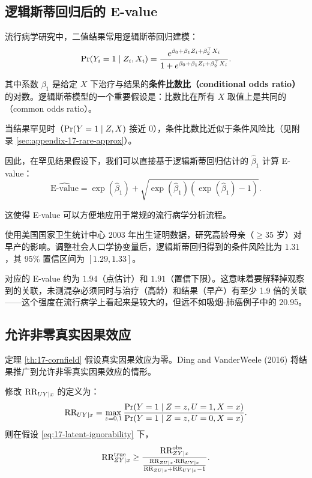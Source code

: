 \subsection{逻辑斯蒂回归后的 E-value}\label{sec:17-evalue-logistic}

流行病学研究中，二值结果常用逻辑斯蒂回归建模：
\begin{equation}
\operatorname{Pr}(Y_i = 1 \mid Z_i, X_i) = \frac{e^{\beta_0 + \beta_1 Z_i + \beta_2^\top X_i}}{1 + e^{\beta_0 + \beta_1 Z_i + \beta_2^\top X_i}} .
\label{eq:17-logistic-model}
\end{equation}

其中系数 $\beta_1$ 是给定 $X$ 下治疗与结果的\textbf{条件比数比（conditional odds ratio）}的对数。逻辑斯蒂模型的一个重要假设是：比数比在所有 $X$ 取值上是共同的（common odds ratio）。

当结果罕见时（$\operatorname{Pr}(Y=1 \mid Z, X)$ 接近 0），条件比数比近似于条件风险比（见附录 \cref{sec:appendix-17-rare-approx}）。

因此，在罕见结果假设下，我们可以直接基于逻辑斯蒂回归估计的 $\hat\beta_1$ 计算 E-value：
\begin{equation}
\widehat{\mathrm{E\text{-}value}} = \exp(\hat\beta_1) + \sqrt{\exp(\hat\beta_1)(\exp(\hat\beta_1) - 1)} .
\label{eq:17-evalue-logistic}
\end{equation}

这使得 E-value 可以方便地应用于常规的流行病学分析流程。

\begin{Example}\label{ex:17-nchs}
使用美国国家卫生统计中心 2003 年出生证明数据，研究高龄母亲（$\geq 35$ 岁）对早产的影响。调整社会人口学协变量后，逻辑斯蒂回归得到的条件风险比为 $1.31$，其 95\% 置信区间为 $[1.29, 1.33]$。

对应的 E-value 约为 $1.94$（点估计）和 $1.91$（置信下限）。这意味着要解释掉观察到的关联，未测混杂必须同时与治疗（高龄）和结果（早产）有至少 1.9 倍的关联——这个强度在流行病学上看起来是较大的，但远不如吸烟-肺癌例子中的 20.95。
\end{Example}

\subsection{允许非零真实因果效应}\label{sec:17-nonzero-effect}

定理 \ref{th:17-cornfield} 假设真实因果效应为零。Ding and VanderWeele (2016) 将结果推广到允许非零真实因果效应的情形。

\begin{Theorem}[含真实因果效应的下界]\label{th:17-true-rr-bound}
修改 $\text{RR}_{UY\mid x}$ 的定义为：
\begin{equation}
\text{RR}_{UY\mid x} = \max_{z=0,1} \frac{\operatorname{Pr}(Y=1 \mid Z=z, U=1, X=x)}{\operatorname{Pr}(Y=1 \mid Z=z, U=0, X=x)} .
\label{eq:17-uy-max}
\end{equation}
则在假设 \cref{eq:17-latent-ignorability} 下，
\begin{equation}
\text{RR}_{ZY\mid x}^{\mathrm{true}} \geq \frac{\text{RR}_{ZY\mid x}^{\mathrm{obs}}}{\frac{\text{RR}_{ZU\mid x} \cdot \text{RR}_{UY\mid x}}{\text{RR}_{ZU\mid x} + \text{RR}_{UY\mid x} - 1}} .
\label{eq:17-true-rr-lower-bound}
\end{equation}
\end{Theorem}

